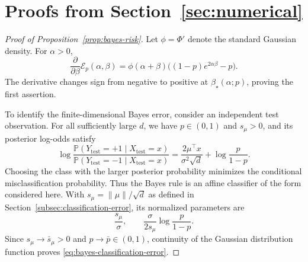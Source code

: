 \section{Proofs from Section~\ref{sec:numerical}}
\label{sec:proof-numerical}

\begin{proof}[Proof of Proposition~\ref{prop:bayes-risk}]
Let $\phi=\Phi'$ denote the standard Gaussian density.
For $\alpha>0$,
\[
    \frac{\partial}{\partial\beta}
        \mathcal E_p(\alpha,\beta)
    =
    \phi(\alpha+\beta)
    \bigl((1-p)e^{2\alpha\beta}-p\bigr).
\]
The derivative changes sign from negative to positive at
$\beta_\star(\alpha;p)$, proving the first assertion.

To identify the finite-dimensional Bayes error, consider an
independent test observation. For all sufficiently large $d$,
we have $p\in(0,1)$ and $s_\mu>0$, and its posterior log-odds satisfy
\[
    \log
    \frac{
        \mathbb P(Y_{\mathrm{test}}=+1
            \mid X_{\mathrm{test}}=x)
    }{
        \mathbb P(Y_{\mathrm{test}}=-1
            \mid X_{\mathrm{test}}=x)
    }
    =
    \frac{2\mu^\top x}{\sigma^2\sqrt d}
    +
    \log\frac{p}{1-p}.
\]
Choosing the class with the larger posterior probability
minimizes the conditional misclassification probability.
Thus the Bayes rule is an affine classifier of the form
considered here. With $s_\mu=\|\mu\|/\sqrt d$ as defined in
Section~\ref{subsec:classification-error}, its normalized parameters are
\[
    \frac{s_\mu}{\sigma},
    \qquad
    \frac{\sigma}{2s_\mu}\log\frac{p}{1-p}.
\]
Since $s_\mu\to\bar s_\mu>0$ and $p\to\bar p\in(0,1)$,
continuity of the Gaussian distribution function proves
\eqref{eq:bayes-classification-error}.
\end{proof}

